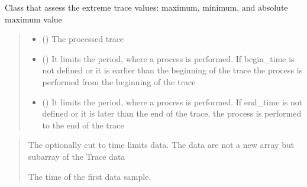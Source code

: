 \documentclass[letterpaper,10pt,english]{sphinxmanual}
\begin{document}
\begin{fulllineitems}
\label{\detokenize{api_core:core.utils.ExtremeTraceValues}}
\pysigstartsignatures
{}
\pysigstopsignatures
\sphinxAtStartPar
Class that assess the extreme trace values: maximum, minimum, and absolute maximum value
\begin{quote}\begin{description}
\begin{itemize}
\item {} 
\sphinxAtStartPar
{} () \textendash{} The processed trace

\item {} 
\sphinxAtStartPar
{} () \textendash{} It limits the period, where a process is performed.
If begin\_time is not defined or it is earlier than the beginning of the trace
the process is performed from the beginning of the trace

\item {} 
\sphinxAtStartPar
{} () \textendash{} It limits the period, where a process is performed.
If end\_time is not defined or it is later than the end of the trace,
the process is performed to the end of the trace

\end{itemize}

\end{description}\end{quote}

\sphinxAtStartPar
{}
\begin{quote}\begin{description}
\sphinxAtStartPar
The optionally cut to time limits data. The data are not a new array but subarray of the Trace data

\sphinxAtStartPar
The time of the first data sample.


\end{description}
\end{quote}
\end{fulllineitems}
\end{document}
